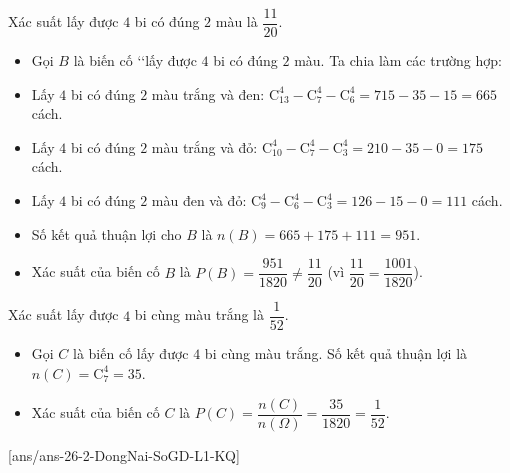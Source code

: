\begin{ex}
{\begin{itemchoice}
			\itemch Xác suất lấy được $4$ bi có đúng $2$ màu là $\dfrac{11}{20}$.
			\begin{itemize}
				\item Gọi $B$ là biến cố  \lq\lq lấy được $4$ bi có đúng $2$ màu. Ta chia làm các trường hợp:
				\item Lấy $4$ bi có đúng $2$ màu trắng và đen: $\mathrm{C}_{13}^4 - \mathrm{C}_{7}^4 - \mathrm{C}_{6}^4 = 715 - 35 - 15 = 665$ cách.
				\item Lấy $4$ bi có đúng $2$ màu trắng và đỏ: $\mathrm{C}_{10}^4 - \mathrm{C}_{7}^4 - \mathrm{C}_{3}^4 = 210 - 35 - 0 = 175$ cách.
				\item Lấy $4$ bi có đúng $2$ màu đen và đỏ: $\mathrm{C}_{9}^4 - \mathrm{C}_{6}^4 - \mathrm{C}_{3}^4 = 126 - 15 - 0 = 111$ cách.
				\item Số kết quả thuận lợi cho $B$ là $n(B) = 665 + 175 + 111 = 951$.
				\item Xác suất của biến cố $B$ là $P(B) = \dfrac{951}{1820} \neq \dfrac{11}{20}$ (vì $\dfrac{11}{20} = \dfrac{1001}{1820}$). 
			\end{itemize}
			
			\itemch Xác suất lấy được $4$ bi cùng màu trắng là $\dfrac{1}{52}$.
			\begin{itemize}
				\item Gọi $C$ là biến cố lấy được $4$ bi cùng màu trắng. Số kết quả thuận lợi là $n(C) = \mathrm{C}_7^4 = 35$.
				\item Xác suất của biến cố $C$ là $P(C) = \dfrac{n(C)}{n(\Omega)} = \dfrac{35}{1820} = \dfrac{1}{52}$. 
			\end{itemize}
		\end{itemchoice}
	}
\end{ex}

[ans/ans-26-2-DongNai-SoGD-L1-KQ]
\caukq

